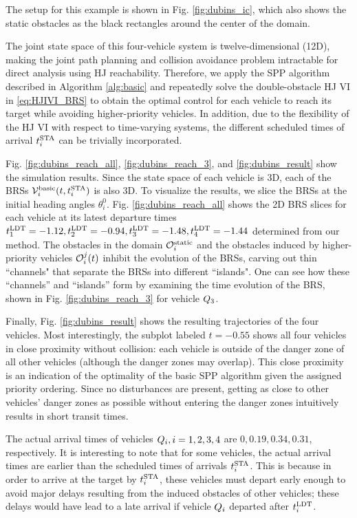 The setup for this example is shown in Fig. \ref{fig:dubins_ic}, which also shows the static obstacles as the black rectangles around the center of the domain.

The joint state space of this four-vehicle system is twelve-dimensional (12D), making the joint path planning and collision avoidance problem intractable for direct analysis using HJ reachability. Therefore, we apply the SPP algorithm described in Algorithm \ref{alg:basic} and repeatedly solve the double-obstacle HJ VI in \eqref{eq:HJIVI_BRS} to obtain the optimal control for each vehicle to reach its target while avoiding higher-priority vehicles. In addition, due to the flexibility of the HJ VI with respect to time-varying systems, the different scheduled times of arrival $t^\text{STA}_i$ can be trivially incorporated. 

Fig. \ref{fig:dubins_reach_all}, \ref{fig:dubins_reach_3}, and \ref{fig:dubins_result} show the simulation results. Since the state space of each vehicle is 3D, each of the BRSs $\mathcal{V}_i^\text{basic}(t, t^\text{STA}_i)$ is also 3D. To visualize the results, we slice the BRSs at the initial heading angles $\theta_i^0$. Fig. \ref{fig:dubins_reach_all} shows the 2D BRS slices for each vehicle at its latest departure times $t^\text{LDT}_1=-1.12, t^\text{LDT}_2=-0.94,t^\text{LDT}_3=-1.48,t^\text{LDT}_4=-1.44$ determined from our method. The obstacles in the domain $\mathcal{O}^\text{static}_i$ and the obstacles induced by higher-priority vehicles $\mathcal{O}_i^j(t)$ inhibit the evolution of the BRSs, carving out thin ``channels" that separate the BRSs into different ``islands". One can see how these ``channels'' and ``islands'' form by examining the time evolution of the BRS, shown in Fig. \ref{fig:dubins_reach_3} for vehicle $Q_3$. 

Finally, Fig. \ref{fig:dubins_result} shows the resulting trajectories of the four vehicles. Most interestingly, the subplot labeled $t=-0.55$ shows all four vehicles in close proximity without collision: each vehicle is outside of the danger zone of all other vehicles (although the danger zones may overlap). This close proximity is an indication of the optimality of the basic SPP algorithm given the assigned priority ordering. Since no disturbances are present, getting as close to other vehicles' danger zones as possible without entering the danger zones intuitively results in short transit times.

The actual arrival times of vehicles $Q_i,i=1,2,3,4$ are $0, 0.19, 0.34, 0.31$, respectively. It is interesting to note that for some vehicles, the actual arrival times are earlier than the scheduled times of arrivals $t^\text{STA}_i$. This is because in order to arrive at the target by $t^\text{STA}_i$, these vehicles must depart early enough to avoid major delays resulting from the induced obstacles of other vehicles; these delays would have lead to a late arrival if vehicle $Q_i$ departed after $t^\text{LDT}_i$.

